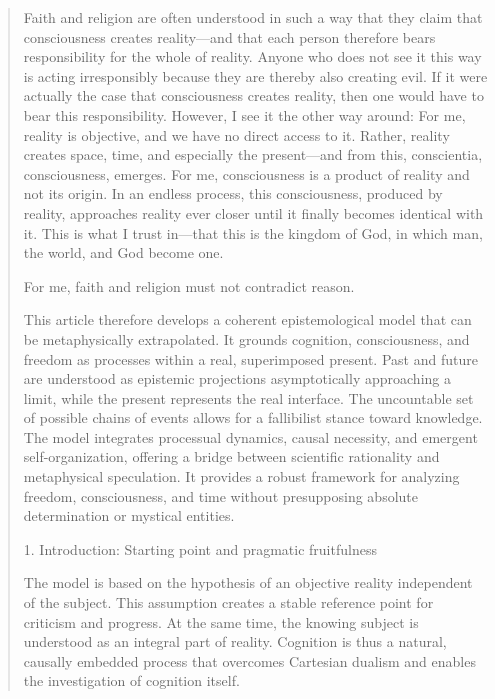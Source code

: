 \documentclass[
  ngerman,
]{article}
\begin{document}
\begin{quote}
Faith and religion are often understood in such a way that they claim
that consciousness creates reality---and that each person therefore
bears responsibility for the whole of reality. Anyone who does not see
it this way is acting irresponsibly because they are thereby also
creating evil. If it were actually the case that consciousness creates
reality, then one would have to bear this responsibility. However, I see
it the other way around: For me, reality is objective, and we have no
direct access to it. Rather, reality creates space, time, and especially
the present---and from this, conscientia, consciousness, emerges. For
me, consciousness is a product of reality and not its origin. In an
endless process, this consciousness, produced by reality, approaches
reality ever closer until it finally becomes identical with it. This is
what I trust in---that this is the kingdom of God, in which man, the
world, and God become one.

For me, faith and religion must not contradict reason.

This article therefore develops a coherent epistemological model that
can be metaphysically extrapolated. It grounds cognition, consciousness,
and freedom as processes within a real, superimposed present. Past and
future are understood as epistemic projections asymptotically
approaching a limit, while the present represents the real interface.
The uncountable set of possible chains of events allows for a
fallibilist stance toward knowledge. The model integrates processual
dynamics, causal necessity, and emergent self-organization, offering a
bridge between scientific rationality and metaphysical speculation. It
provides a robust framework for analyzing freedom, consciousness, and
time without presupposing absolute determination or mystical entities.

1. Introduction: Starting point and pragmatic fruitfulness

The model is based on the hypothesis of an objective reality independent
of the subject. This assumption creates a stable reference point for
criticism and progress. At the same time, the knowing subject is
understood as an integral part of reality. Cognition is thus a natural,
causally embedded process that overcomes Cartesian dualism and enables
the investigation of cognition itself.


\end{quote}
\end{document}
